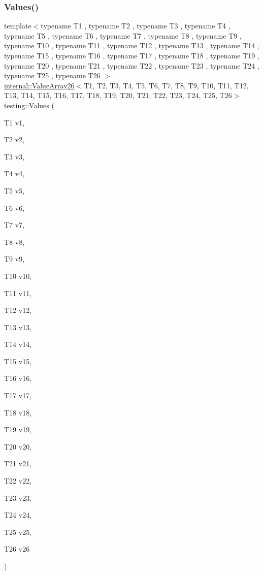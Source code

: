 \mbox{\label{namespacetesting_aeca27a322529e5bbd6331e40c810a123}} 
\subsubsection{\texorpdfstring{Values()}{Values()}\hspace{0.1cm}{\footnotesize\ttfamily [27/51]}}
{\footnotesize\ttfamily template$<$typename T1 , typename T2 , typename T3 , typename T4 , typename T5 , typename T6 , typename T7 , typename T8 , typename T9 , typename T10 , typename T11 , typename T12 , typename T13 , typename T14 , typename T15 , typename T16 , typename T17 , typename T18 , typename T19 , typename T20 , typename T21 , typename T22 , typename T23 , typename T24 , typename T25 , typename T26 $>$ \\
\mbox{\hyperlink{classtesting_1_1internal_1_1_value_array26}{internal\+::\+Value\+Array26}}$<$T1, T2, T3, T4, T5, T6, T7, T8, T9, T10, T11, T12, T13, T14, T15, T16, T17, T18, T19, T20, T21, T22, T23, T24, T25, T26$>$ testing\+::\+Values (\begin{DoxyParamCaption}\item[{T1}]{v1,  }\item[{T2}]{v2,  }\item[{T3}]{v3,  }\item[{T4}]{v4,  }\item[{T5}]{v5,  }\item[{T6}]{v6,  }\item[{T7}]{v7,  }\item[{T8}]{v8,  }\item[{T9}]{v9,  }\item[{T10}]{v10,  }\item[{T11}]{v11,  }\item[{T12}]{v12,  }\item[{T13}]{v13,  }\item[{T14}]{v14,  }\item[{T15}]{v15,  }\item[{T16}]{v16,  }\item[{T17}]{v17,  }\item[{T18}]{v18,  }\item[{T19}]{v19,  }\item[{T20}]{v20,  }\item[{T21}]{v21,  }\item[{T22}]{v22,  }\item[{T23}]{v23,  }\item[{T24}]{v24,  }\item[{T25}]{v25,  }\item[{T26}]{v26 }\end{DoxyParamCaption})}

